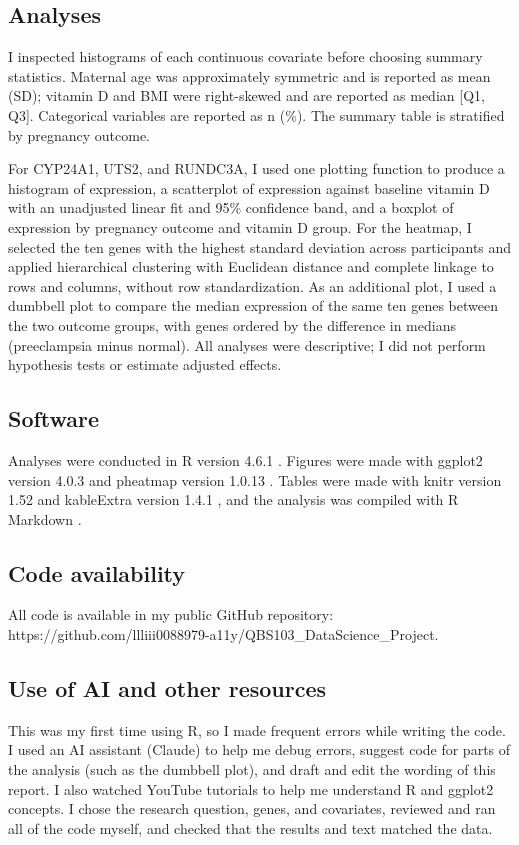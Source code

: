 \documentclass[11pt]{article}
\begin{document}
\subsection{Analyses}
I inspected histograms of each continuous covariate before choosing
summary statistics. Maternal age was approximately symmetric and is
reported as mean (SD); vitamin D and BMI were right-skewed and are
reported as median [Q1, Q3]. Categorical variables are reported as
n (\%). The summary table is stratified by pregnancy outcome.

For CYP24A1, UTS2, and RUNDC3A, I used one plotting function to produce a
histogram of expression, a scatterplot of expression against baseline
vitamin D with an unadjusted linear fit and 95\% confidence band, and a
boxplot of expression by pregnancy outcome and vitamin D group. For the
heatmap, I selected the ten genes with the highest standard deviation
across participants and applied hierarchical clustering with Euclidean
distance and complete linkage to rows and columns, without row
standardization. As an additional plot, I used a dumbbell plot to compare the median
expression of the same ten genes between the two outcome groups, with
genes ordered by the difference in medians (preeclampsia minus normal). All
analyses were descriptive; I did not perform hypothesis tests or estimate
adjusted effects.

\subsection{Software}
Analyses were conducted in R version 4.6.1 \cite{RCoreTeam}.
Figures were made with ggplot2 version 4.0.3
\cite{Wickham2016} and pheatmap version 1.0.13
\cite{Kolde_pheatmap}. Tables were made with knitr version
1.52 \cite{Xie2015} and kableExtra version
1.4.1 \cite{Zhu_kableExtra}, and the analysis was
compiled with R Markdown \cite{Xie2018}.

\subsection{Code availability}
All code is available in my public GitHub repository:\\
https://github.com/llliii0088979-a11y/QBS103\_DataScience\_Project.

\subsection{Use of AI and other resources}
This was my first time using R, so I made frequent errors while writing
the code. I used an AI assistant (Claude) to help me debug errors,
suggest code for parts of the analysis (such as the dumbbell plot), and
draft and edit the wording of this report. I also watched YouTube
tutorials to help me understand R and ggplot2 concepts. I chose the
research question, genes, and covariates, reviewed and ran all of the
code myself, and checked that the results and text matched the data.
\end{document}
